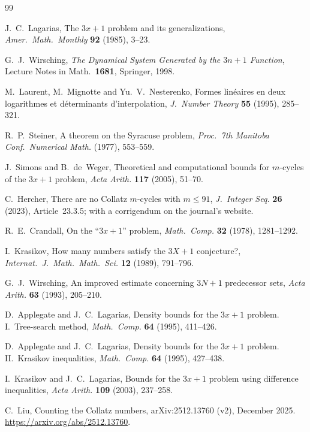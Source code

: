 \documentclass[11pt,reqno,oneside]{amsart}
\begin{document}
{\small\setlength{\itemsep}{1pt}\begin{thebibliography}{99}

J.~C.~Lagarias, The $3x+1$ problem and its generalizations, \emph{Amer.\ Math.\ Monthly} \textbf{92} (1985), 3--23.

G.~J.~Wirsching, \emph{The Dynamical System Generated by the $3n+1$ Function}, Lecture Notes in Math.\ \textbf{1681}, Springer, 1998.

M.~Laurent, M.~Mignotte and Yu.~V.~Nesterenko, Formes lin\'eaires en deux logarithmes et d\'eterminants d'interpolation, \emph{J.\ Number Theory} \textbf{55} (1995), 285--321.

R.~P.~Steiner, A theorem on the Syracuse problem, \emph{Proc.\ 7th Manitoba Conf.\ Numerical Math.} (1977), 553--559.

J.~Simons and B.~de~Weger, Theoretical and computational bounds for $m$-cycles of the $3x+1$ problem, \emph{Acta Arith.} \textbf{117} (2005), 51--70.

C.~Hercher, There are no Collatz $m$-cycles with $m\le 91$, \emph{J.\ Integer Seq.} \textbf{26} (2023), Article~23.3.5; with a corrigendum on the journal's website.

R.~E.~Crandall, On the ``$3x+1$'' problem, \emph{Math.\ Comp.} \textbf{32} (1978), 1281--1292.

I.~Krasikov, How many numbers satisfy the $3X+1$ conjecture?, \emph{Internat.\ J.\ Math.\ Math.\ Sci.} \textbf{12} (1989), 791--796.

G.~J.~Wirsching, An improved estimate concerning $3N+1$ predecessor sets, \emph{Acta Arith.} \textbf{63} (1993), 205--210.

D.~Applegate and J.~C.~Lagarias, Density bounds for the $3x+1$ problem. I.\ Tree-search method, \emph{Math.\ Comp.} \textbf{64} (1995), 411--426.

D.~Applegate and J.~C.~Lagarias, Density bounds for the $3x+1$ problem. II.\ Krasikov inequalities, \emph{Math.\ Comp.} \textbf{64} (1995), 427--438.

I.~Krasikov and J.~C.~Lagarias, Bounds for the $3x+1$ problem using difference inequalities, \emph{Acta Arith.} \textbf{109} (2003), 237--258.

C.~Liu, Counting the Collatz numbers, arXiv:2512.13760 (v2), December 2025. \url{https://arxiv.org/abs/2512.13760}.


\end{thebibliography}}
\end{document}
